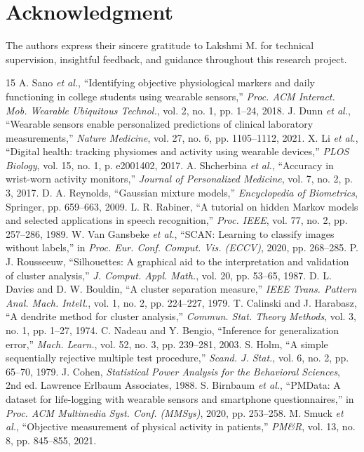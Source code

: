 \documentclass[conference]{IEEEtran}
\begin{document}
\section*{Acknowledgment}
The authors express their sincere gratitude to Lakshmi M. for technical supervision, insightful feedback, and guidance throughout this research project.

\begin{thebibliography}{15}
 A. Sano \textit{et al.}, ``Identifying objective physiological markers and daily functioning in college students using wearable sensors,'' \textit{Proc. ACM Interact. Mob. Wearable Ubiquitous Technol.}, vol. 2, no. 1, pp. 1--24, 2018.
 J. Dunn \textit{et al.}, ``Wearable sensors enable personalized predictions of clinical laboratory measurements,'' \textit{Nature Medicine}, vol. 27, no. 6, pp. 1105--1112, 2021.
 X. Li \textit{et al.}, ``Digital health: tracking physiomes and activity using wearable devices,'' \textit{PLOS Biology}, vol. 15, no. 1, p. e2001402, 2017.
 A. Shcherbina \textit{et al.}, ``Accuracy in wrist-worn activity monitors,'' \textit{Journal of Personalized Medicine}, vol. 7, no. 2, p. 3, 2017.
 D. A. Reynolds, ``Gaussian mixture models,'' \textit{Encyclopedia of Biometrics}, Springer, pp. 659--663, 2009.
 L. R. Rabiner, ``A tutorial on hidden Markov models and selected applications in speech recognition,'' \textit{Proc. IEEE}, vol. 77, no. 2, pp. 257--286, 1989.
 W. Van Gansbeke \textit{et al.}, ``SCAN: Learning to classify images without labels,'' in \textit{Proc. Eur. Conf. Comput. Vis. (ECCV)}, 2020, pp. 268--285.
 P. J. Rousseeuw, ``Silhouettes: A graphical aid to the interpretation and validation of cluster analysis,'' \textit{J. Comput. Appl. Math.}, vol. 20, pp. 53--65, 1987.
 D. L. Davies and D. W. Bouldin, ``A cluster separation measure,'' \textit{IEEE Trans. Pattern Anal. Mach. Intell.}, vol. 1, no. 2, pp. 224--227, 1979.
 T. Calinski and J. Harabasz, ``A dendrite method for cluster analysis,'' \textit{Commun. Stat. Theory Methods}, vol. 3, no. 1, pp. 1--27, 1974.
 C. Nadeau and Y. Bengio, ``Inference for generalization error,'' \textit{Mach. Learn.}, vol. 52, no. 3, pp. 239--281, 2003.
 S. Holm, ``A simple sequentially rejective multiple test procedure,'' \textit{Scand. J. Stat.}, vol. 6, no. 2, pp. 65--70, 1979.
 J. Cohen, \textit{Statistical Power Analysis for the Behavioral Sciences}, 2nd ed. Lawrence Erlbaum Associates, 1988.
 S. Birnbaum \textit{et al.}, ``PMData: A dataset for life-logging with wearable sensors and smartphone questionnaires,'' in \textit{Proc. ACM Multimedia Syst. Conf. (MMSys)}, 2020, pp. 253--258.
 M. Smuck \textit{et al.}, ``Objective measurement of physical activity in patients,'' \textit{PM\&R}, vol. 13, no. 8, pp. 845--855, 2021.
\end{thebibliography}
\end{document}
